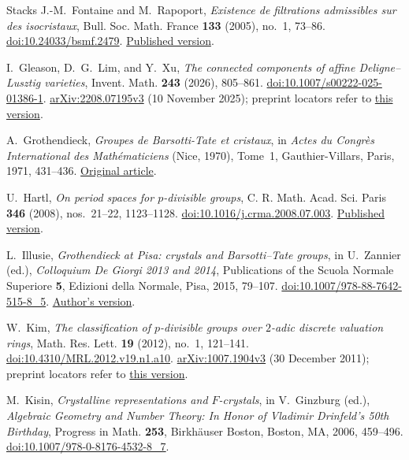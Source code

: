 \begin{thebibliography}{Stacks}
J.-M.~Fontaine and M.~Rapoport,
\emph{Existence de filtrations admissibles sur des isocristaux},
Bull. Soc. Math. France \textbf{133} (2005), no.~1, 73--86.
\href{https://doi.org/10.24033/bsmf.2479}{doi:10.24033/bsmf.2479}.
\href{https://www.numdam.org/article/BSMF_2005__133_1_73_0.pdf}{Published version}.

I.~Gleason, D.~G.~Lim, and Y.~Xu,
\emph{The connected components of affine Deligne--Lusztig varieties},
Invent. Math. \textbf{243} (2026), 805--861.
\href{https://doi.org/10.1007/s00222-025-01386-1}{doi:10.1007/s00222-025-01386-1}.
\href{https://arxiv.org/abs/2208.07195v3}{arXiv:2208.07195v3}
(10 November 2025); preprint locators refer to
\href{https://arxiv.org/pdf/2208.07195v3}{this version}.

A.~Grothendieck,
\emph{Groupes de Barsotti-Tate et cristaux},
in \emph{Actes du Congr\`es International des Math\'ematiciens}
(Nice, 1970), Tome~1, Gauthier-Villars, Paris, 1971, 431--436.
\href{https://webusers.imj-prg.fr/~leila.schneps/grothendieckcircle/GroupesB-T.pdf}{Original article}.

U.~Hartl,
\emph{On period spaces for $p$-divisible groups},
C. R. Math. Acad. Sci. Paris \textbf{346} (2008), nos.~21--22, 1123--1128.
\href{https://doi.org/10.1016/j.crma.2008.07.003}{doi:10.1016/j.crma.2008.07.003}.
\href{https://comptes-rendus.academie-sciences.fr/mathematique/item/10.1016/j.crma.2008.07.003.pdf}{Published version}.

L.~Illusie,
\emph{Grothendieck at Pisa: crystals and Barsotti--Tate groups},
in U.~Zannier (ed.), \emph{Colloquium De Giorgi 2013 and 2014},
Publications of the Scuola Normale Superiore \textbf{5},
Edizioni della Normale, Pisa, 2015, 79--107.
\href{https://doi.org/10.1007/978-88-7642-515-8_5}{doi:10.1007/978-88-7642-515-8\_5}.
\href{https://www.imo.universite-paris-saclay.fr/~luc.illusie/Illusie-Pisa5.pdf}{Author's version}.

W.~Kim,
\emph{The classification of $p$-divisible groups over $2$-adic discrete
valuation rings},
Math. Res. Lett. \textbf{19} (2012), no.~1, 121--141.
\href{https://doi.org/10.4310/MRL.2012.v19.n1.a10}{doi:10.4310/MRL.2012.v19.n1.a10}.
\href{https://arxiv.org/abs/1007.1904v3}{arXiv:1007.1904v3}
(30 December 2011); preprint locators refer to
\href{https://arxiv.org/pdf/1007.1904v3}{this version}.

M.~Kisin,
\emph{Crystalline representations and $F$-crystals},
in V.~Ginzburg (ed.), \emph{Algebraic Geometry and Number Theory:
In Honor of Vladimir Drinfeld's 50th Birthday},
Progress in Math. \textbf{253}, Birkh\"auser Boston, Boston, MA,
2006, 459--496.
\href{https://doi.org/10.1007/978-0-8176-4532-8_7}{doi:10.1007/978-0-8176-4532-8\_7}.


\end{thebibliography}
